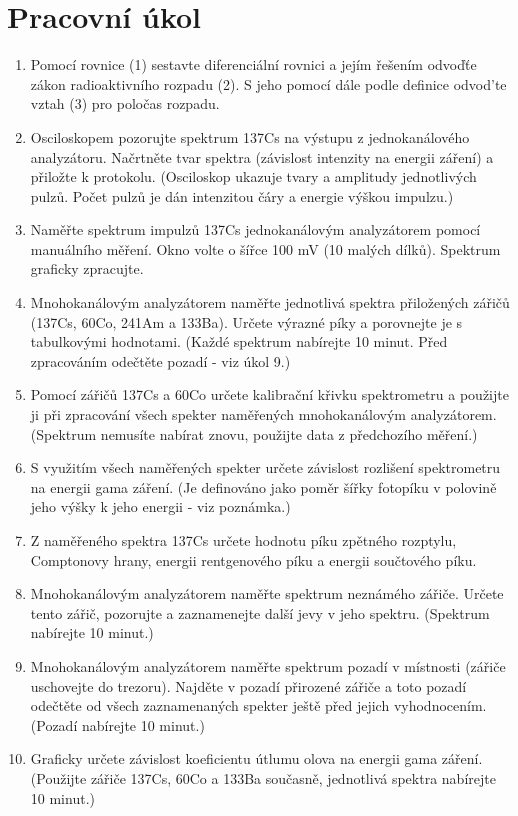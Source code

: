 \section{Pracovní úkol}
\begin{enumerate}
\item Pomocí rovnice (1) sestavte diferenciální rovnici a jejím řešením odvoďťe
zákon radioaktivního rozpadu (2). S jeho pomocí dále podle definice odvod’te vztah
(3) pro poločas rozpadu.
\item Osciloskopem pozorujte spektrum 137Cs na výstupu z jednokanálového analyzátoru. Načrtněte
tvar spektra (závislost intenzity na energii záření) a přiložte k protokolu. (Osciloskop ukazuje
tvary a amplitudy jednotlivých pulzů. Počet pulzů je dán intenzitou čáry a energie výškou impulzu.)
\item Naměřte spektrum impulzů 137Cs jednokanálovým analyzátorem pomocí manuálního měření.
Okno volte o šířce 100 mV (10 malých dílků). Spektrum graficky zpracujte.
\item Mnohokanálovým analyzátorem naměřte jednotlivá spektra přiložených zářičů (137Cs, 60Co,
241Am a 133Ba). Určete výrazné píky a porovnejte je s tabulkovými hodnotami. (Každé spektrum
nabírejte 10 minut. Před zpracováním odečtěte pozadí - viz úkol 9.)
\item Pomocí zářičů 137Cs a 60Co určete kalibrační křivku spektrometru a použijte ji při zpracování
všech spekter naměřených mnohokanálovým analyzátorem. (Spektrum nemusíte nabírat znovu,
použijte data z předchozího měření.)
\item S využitím všech naměřených spekter určete závislost rozlišení spektrometru na energii gama
záření. (Je definováno jako poměr šířky fotopíku v polovině jeho výšky k jeho energii - viz
poznámka.)
\item Z naměřeného spektra 137Cs určete hodnotu píku zpětného rozptylu, Comptonovy hrany,
energii rentgenového píku a energii součtového píku.
\item Mnohokanálovým analyzátorem naměřte spektrum neznámého zářiče. Určete tento zářič, pozorujte
a zaznamenejte další jevy v jeho spektru. (Spektrum nabírejte 10 minut.)
\item Mnohokanálovým analyzátorem naměřte spektrum pozadí v místnosti (zářiče uschovejte do
trezoru). Najděte v pozadí přirozené zářiče a toto pozadí odečtěte od všech zaznamenaných
spekter ještě před jejich vyhodnocením. (Pozadí nabírejte 10 minut.)
\item Graficky určete závislost koeficientu útlumu olova na energii gama záření. (Použijte zářiče
137Cs, 60Co a 133Ba současně, jednotlivá spektra nabírejte 10 minut.)
\end{enumerate}

